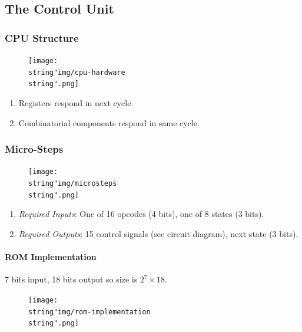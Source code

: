 \documentclass[twocolumn,english]{article}
\begin{document}
\subsection{The Control Unit}


\subsubsection{CPU Structure}

\begin{figure}[H]
\noindent \centering{}\texttt{[image: \\string"img/cpu-hardware\\string".png]}
\end{figure}

\begin{enumerate}
\item Registers respond in next cycle.
\item Combinatorial components respond in same cycle.
\end{enumerate}

\subsubsection{Micro-Steps}

\begin{figure}[H]
\noindent \centering{}\texttt{[image: \\string"img/microsteps\\string".png]}
\end{figure}

\begin{enumerate}
\item \emph{Required Inputs}: One of 16 opcodes (4 bits), one of 8 states
(3 bits).
\item \emph{Required Outputs}: 15 control signals (see circuit diagram),
next state (3 bits).
\end{enumerate}

\paragraph{ROM Implementation}

7 bits input, 18 bits output so size is $2^{7}\times18$.

\begin{figure}[H]
\noindent \centering{}\texttt{[image: \\string"img/rom-implementation\\string".png]}
\end{figure}
\end{document}
